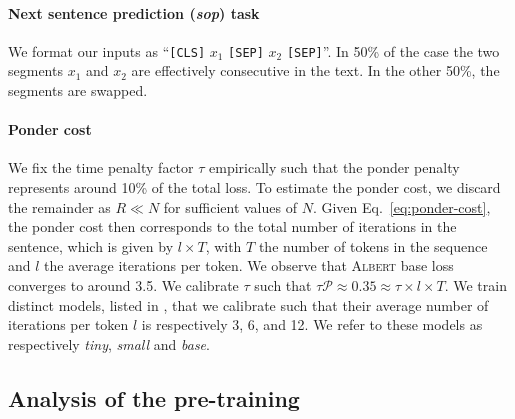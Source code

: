 \paragraph{Next sentence prediction (\textit{sop}) task} We format our inputs as ``\texttt{[CLS]} $x_1$ \texttt{[SEP]} $x_2$ \texttt{[SEP]}''. In 50\% of the case the two segments $x_1$ and $x_2$ are effectively consecutive in the text. In the other 50\%, the segments are swapped. 

\paragraph{Ponder cost} We fix the time penalty factor $\tau$ empirically such that the ponder penalty represents around 10\% of the total loss. To estimate the ponder cost, we discard the remainder as $R \ll N$ for sufficient values of $N$. Given Eq.~\ref{eq:ponder-cost}, the ponder cost then corresponds to the total number of iterations in the sentence, which is given by $l \times T$, with $T$ the number of tokens in the sequence and $l$ the average iterations per token. We observe that \textsc{Albert} base loss converges to around 3.5. We calibrate $\tau$ such that  $\tau\mathcal{P} \approx 0.35 \approx \tau \times l \times T$. We train distinct models, listed in , that we calibrate such that their average number of iterations per token $l$ is respectively 3, 6, and 12. We refer to these models as respectively \textit{tiny}, \textit{small} and \textit{base}. 

\subsection{Analysis of the pre-training}

